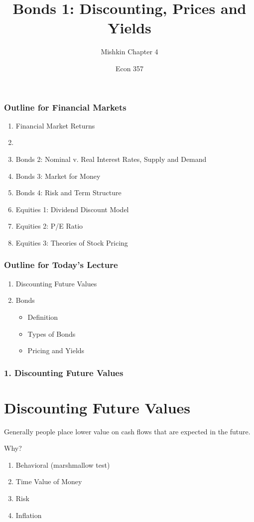 \documentclass{beamer}
\title{Bonds 1: Discounting, Prices and Yields}
\subtitle{Mishkin Chapter 4}
\author{Econ 357}
\date{\week}
\begin{document}
\frame{\titlepage}



\begin{frame}
    \frametitle{Outline for Financial Markets}
        \begin{enumerate}
            \item Financial Market Returns
            \item {}
            \item Bonds 2: Nominal v. Real Interest Rates, Supply and Demand
            \item Bonds 3: Market for Money
            \item Bonds 4: Risk and Term Structure
            \item Equities 1: Dividend Discount Model
            \item Equities 2: P/E Ratio
            \item Equities 3: Theories of Stock Pricing
            
        \end{enumerate}
\end{frame}


\begin{frame}
    \frametitle{Outline for Today's Lecture}
    \begin{enumerate}
        \item Discounting Future Values
        \item Bonds
        \begin{itemize}
            \item Definition
            \item Types of Bonds
            \item Pricing and Yields
        \end{itemize}
    \end{enumerate}

\end{frame}

\begin{frame}[t]
    \frametitle{1. Discounting Future Values}
    \section{Discounting Future Values}

    Generally people place lower value on cash flows that are expected in the future.  
    
    \vspace{1em}
    
    Why?
    
    \vspace{1em}
    \begin{enumerate}
        \item Behavioral (marshmallow test)
        \item Time Value of Money
        \item Risk
        \item Inflation
    \end{enumerate}

\end{frame}
\end{document}
